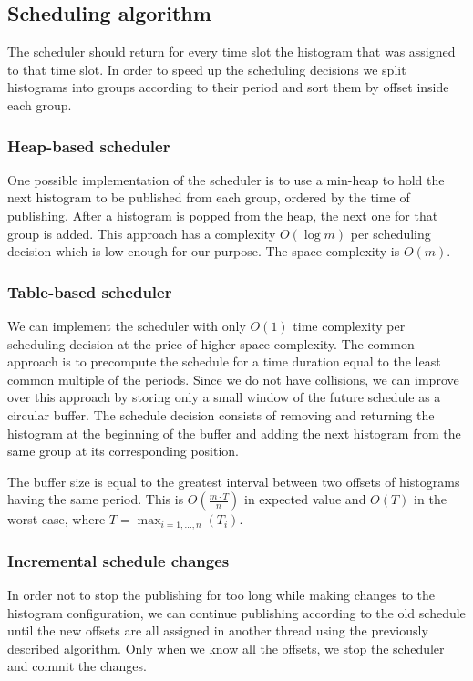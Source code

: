 \subsection*{Scheduling algorithm}
The scheduler should return for every time slot the histogram that was assigned to that time slot. In order to speed up the scheduling decisions we split histograms into groups according to their period and sort them by offset inside each group. 

\subsubsection*{Heap-based scheduler}
One possible implementation of the scheduler is to use a min-heap to hold the next histogram to be published from each group, ordered by the time of publishing. After a histogram is popped from the heap, the next one for that group is added. This approach has a complexity $O(\log m)$ per scheduling decision which is low enough for our purpose. The space complexity is $O(m)$.

\subsubsection*{Table-based scheduler}

We can implement the scheduler with only $O(1)$ time complexity per scheduling decision at the price of higher space complexity. The common approach is to precompute the schedule for a time duration equal to the least common multiple of the periods. Since we do not have collisions, we can improve over this approach by storing only a small window of the future schedule as a circular buffer. The schedule decision consists of removing and returning the histogram at the beginning of the buffer and adding the next histogram from the same group at its corresponding position.
 
The buffer size is equal to the greatest interval between two offsets of histograms having the same period. This is $O\left(\frac {m \cdot T}  n\right)$ in expected value and $O(T)$ in the worst case, where $T=\max_{i=1,\ldots,n}(T_i)$.

\subsubsection*{Incremental schedule changes}

In order not to stop the publishing for too long while making changes to the histogram configuration, we can continue publishing according to the old schedule until the new offsets are all assigned in another thread using the previously described algorithm. Only when we know all the offsets, we stop the scheduler and commit the changes.

